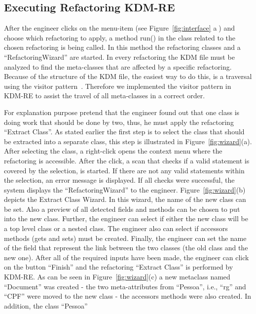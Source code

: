 \subsection{Executing Refactoring KDM-RE}

After the engineer clicks on the menu-item (see Figure~\ref{fig:interface} \textcircled{a}) and choose which refactoring to apply, a method run() in the class related to the chosen refactoring is being called. In this method the refactoring classes and a ``RefactoringWizard'' are started. In every refactoring the KDM file must be analyzed to find the meta-classes that are affected by a specific refactoring. Because of the structure of the KDM file, the easiest way to do this, is a traversal using the visitor pattern~\cite{gamma}. Therefore we implemented the visitor pattern in KDM-RE to assist the travel of all meta-classes in a correct order.

For explanation purpose pretend that the engineer found out that one class is doing work that should be done by two, thus, he must apply the refactoring ``Extract Class''. As stated earlier the first step is to select the class that should be extracted into a separate class, this step is illustrated in Figure~\ref{fig:wizard}(a). After selecting the class, a right-click opens the context menu where the refactoring is accessible. After the click, a scan that checks if a valid statement is covered by the selection, is started. If there are not any valid statements within the selection, an error message is displayed. If all checks were successful, the system displays the ``RefactoringWizard'' to the engineer. Figure~\ref{fig:wizard}(b) depicts the Extract Class Wizard. In this wizard, the name of the new class can be set. Also a preview of all detected fields and methods can be chosen to put into the new class. Further, the engineer can select if either the new class will be a top level class or a nested class. The engineer also can select if accessors methods (gets and sets) must be created. Finally, the engineer can set the name of the field that represent the link between the two classes (the old class and the new one). After all of the required inputs have been made, the engineer can click on the button ``Finish'' and the refactoring ``Extract Class'' is performed by KDM-RE. As can be seen in Figure~\ref{fig:wizard}(c) a new metaclass named ``Document'' was created - the two meta-attributes from ``Pessoa'', i.e., ``rg'' and ``CPF'' were moved to the new class - the accessors methods were also created. In addition, the class ``Pessoa''    


